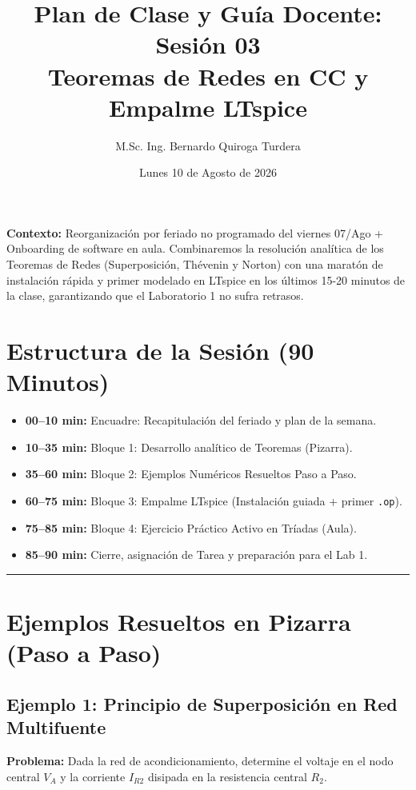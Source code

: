 \documentclass[11pt,a4paper]{article}
\title{\vspace{-1.5cm}\Large\textbf{Plan de Clase y Guía Docente: Sesión 03}\\
\large Teoremas de Redes en CC y Empalme LTspice}
\author{M.Sc. Ing. Bernardo Quiroga Turdera}
\date{Lunes 10 de Agosto de 2026}
\begin{document}
\maketitle
\vspace{-0.5cm}

\begin{tcolorbox}[caja_aviso={Ajuste de Calendario (Semana 2)}]
\textbf{Contexto:} Reorganización por feriado no programado del viernes 07/Ago + Onboarding de software en aula.
Combinaremos la resolución analítica de los Teoremas de Redes (Superposición, Thévenin y Norton) con una maratón de instalación rápida y primer modelado en LTspice en los últimos 15-20 minutos de la clase, garantizando que el Laboratorio 1 no sufra retrasos.
\end{tcolorbox}

\section*{Estructura de la Sesión (90 Minutos)}
\begin{itemize}[label=$\circ$, itemsep=0pt]
    \item \textbf{00--10 min:} Encuadre: Recapitulación del feriado y plan de la semana.
    \item \textbf{10--35 min:} Bloque 1: Desarrollo analítico de Teoremas (Pizarra).
    \item \textbf{35--60 min:} Bloque 2: Ejemplos Numéricos Resueltos Paso a Paso.
    \item \textbf{60--75 min:} Bloque 3: Empalme LTspice (Instalación guiada + primer \texttt{.op}).
    \item \textbf{75--85 min:} Bloque 4: Ejercicio Práctico Activo en Tríadas (Aula).
    \item \textbf{85--90 min:} Cierre, asignación de Tarea y preparación para el Lab 1.
\end{itemize}

\vspace{0.4cm}
\hrule
\vspace{0.4cm}

\section{Ejemplos Resueltos en Pizarra (Paso a Paso)}

\subsection*{Ejemplo 1: Principio de Superposición en Red Multifuente}
\textbf{Problema:} Dada la red de acondicionamiento, determine el voltaje en el nodo central $V_A$ y la corriente $I_{R2}$ disipada en la resistencia central $R_2$.
\end{document}
